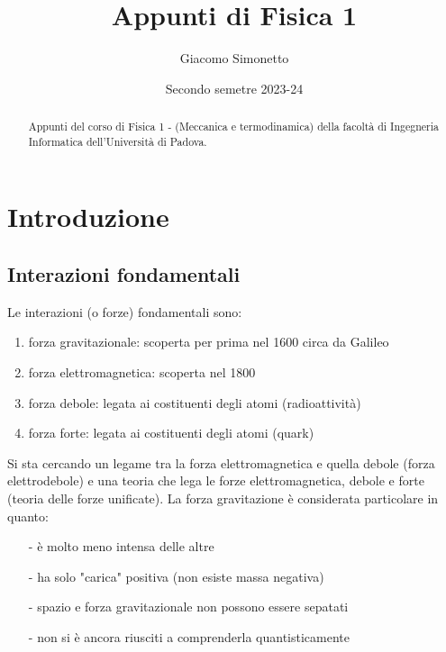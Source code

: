 \documentclass[a4paper]{article}
\title{Appunti di Fisica 1}
\author{Giacomo Simonetto}
\date{Secondo semetre 2023-24}
\begin{document}
\maketitle
\begin{abstract}
	Appunti del corso di Fisica 1 - (Meccanica e termodinamica) della facoltà di Ingegneria Informatica dell'Università di Padova.
\end{abstract}

\newpage

\tableofcontents

\newpage

\section{Introduzione}
\subsection{Interazioni fondamentali}
Le interazioni (o forze) fondamentali sono:
\begin{enumerate}[topsep=3pt, itemsep=0pt]
	\item forza gravitazionale: scoperta per prima nel 1600 circa da Galileo
	\item forza elettromagnetica: scoperta nel 1800
	\item forza debole: legata ai costituenti degli atomi (radioattività)
	\item forza forte: legata ai costituenti degli atomi (quark)
\end{enumerate}
Si sta cercando un legame tra la forza elettromagnetica e quella debole (forza elettrodebole) e una teoria che lega le forze
elettromagnetica, debole e forte (teoria delle forze unificate). La forza gravitazione è considerata particolare in quanto:
\begin{itemize}[topsep=3pt, itemsep=0pt]
	\item[-] è molto meno intensa delle altre
	\item[-] ha solo "carica" positiva (non esiste massa negativa)
	\item[-] spazio e forza gravitazionale non possono essere sepatati
	\item[-] non si è ancora riusciti a comprenderla quantisticamente
\end{itemize}
\end{document}
